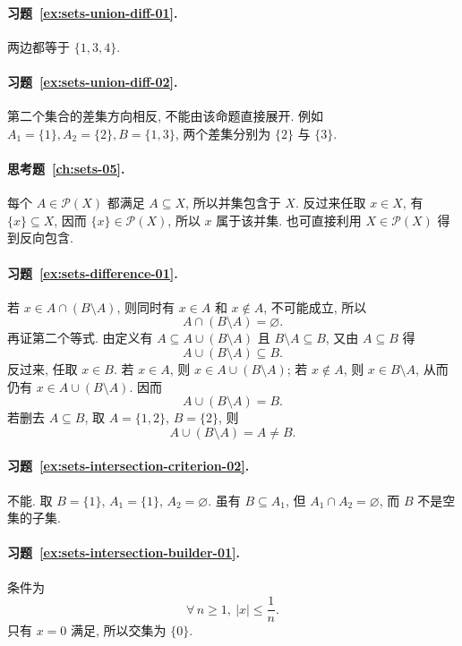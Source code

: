 \documentclass[usesamecnt, thmcnt=section, lang=cn, newtx, 10pt, scheme=chinese]{elegantbook}
\begin{document}
\paragraph*{习题~\ref{ex:sets-union-diff-01}.}
两边都等于 $\{1,3,4\}$.

\paragraph*{习题~\ref{ex:sets-union-diff-02}.}
第二个集合的差集方向相反, 不能由该命题直接展开. 例如 $A_1=\{1\},A_2=\{2\},B=\{1,3\}$, 两个差集分别为 $\{2\}$ 与 $\{3\}$.

\paragraph*{思考题~\ref{ch:sets-05}.}
每个 $A\in\mathscr P(X)$ 都满足 $A\subseteq X$, 所以并集包含于 $X$. 反过来任取 $x\in X$, 有 $\{x\}\subseteq X$, 因而 $\{x\}\in\mathscr P(X)$, 所以 $x$ 属于该并集. 也可直接利用 $X\in\mathscr P(X)$ 得到反向包含.

\paragraph*{习题~\ref{ex:sets-difference-01}.}
若 $x\in A\cap(B\setminus A)$, 则同时有 $x\in A$ 和 $x\notin A$, 不可能成立, 所以
\[
 A\cap(B\setminus A)=\varnothing.
\]
再证第二个等式. 由定义有 $A\subseteq A\cup(B\setminus A)$ 且 $B\setminus A\subseteq B$, 又由 $A\subseteq B$ 得
\[
 A\cup(B\setminus A)\subseteq B.
\]
反过来, 任取 $x\in B$. 若 $x\in A$, 则 $x\in A\cup(B\setminus A)$; 若 $x\notin A$, 则 $x\in B\setminus A$, 从而仍有 $x\in A\cup(B\setminus A)$. 因而
\[
 A\cup(B\setminus A)=B.
\]
若删去 $A\subseteq B$, 取 $A=\{1,2\}$, $B=\{2\}$, 则
\[
 A\cup(B\setminus A)=A\neq B.
\]

\paragraph*{习题~\ref{ex:sets-intersection-criterion-02}.}
不能. 取 $B=\{1\}$, $A_1=\{1\}$, $A_2=\varnothing$. 虽有 $B\subseteq A_1$, 但 $A_1\cap A_2=\varnothing$, 而 $B$ 不是空集的子集.

\paragraph*{习题~\ref{ex:sets-intersection-builder-01}.}
条件为
\[
 \forall\,n\geq1,\ |x|\leq\frac1n.
\]
只有 $x=0$ 满足, 所以交集为 $\{0\}$.
\end{document}

